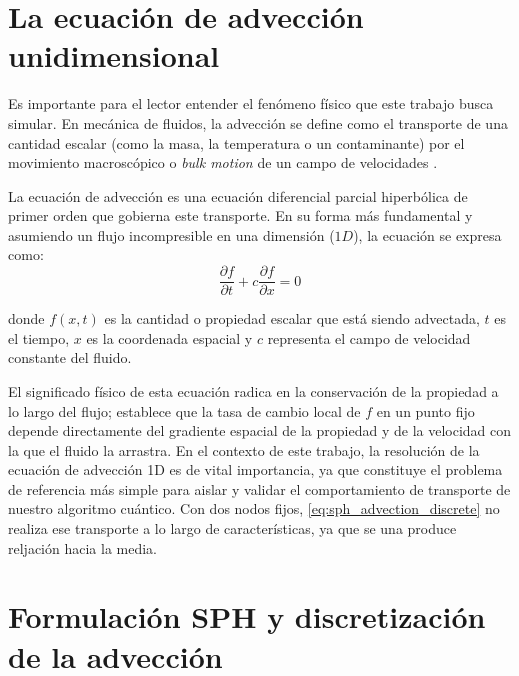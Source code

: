 \section{La ecuación de advección unidimensional}
\label{sec:adcevtion}

Es importante para el lector entender el fenómeno físico que este trabajo busca simular. En mecánica de fluidos, la advección se define como el transporte de una cantidad escalar (como la masa, la temperatura o un contaminante) por el movimiento macroscópico o \emph{bulk motion} de un campo de velocidades \cite{leveque2002finite}.

La ecuación de advección es una ecuación diferencial parcial hiperbólica de primer orden que gobierna este transporte. En su forma más fundamental y asumiendo un flujo incompresible en una dimensión ($1D$), la ecuación se expresa como:
\begin{equation}
    \frac{\partial f}{\partial t} + c \frac{\partial f}{\partial x} = 0
    \label{ec: advection}
\end{equation}

donde $f(x,t)$ es la cantidad o propiedad escalar que está siendo advectada, $t$ es el tiempo, $x$ es la coordenada espacial y $c$ representa el campo de velocidad constante del fluido.

El significado físico de esta ecuación radica en la conservación de la propiedad a lo largo del flujo; establece que la tasa de cambio local de $f$ en un punto fijo depende directamente del gradiente espacial de la propiedad y de la velocidad con la que el fluido la arrastra. En el contexto de este trabajo, la resolución de la ecuación de advección 1D es de vital importancia, ya que constituye el problema de referencia más simple para aislar y validar el comportamiento de transporte de nuestro algoritmo cuántico. Con dos nodos fijos, \eqref{eq:sph_advection_discrete} no realiza ese transporte a lo largo de características, ya que se una produce reljación hacia la media.


\section{Formulación SPH y discretización de la advección}
\label{sec:sph}

